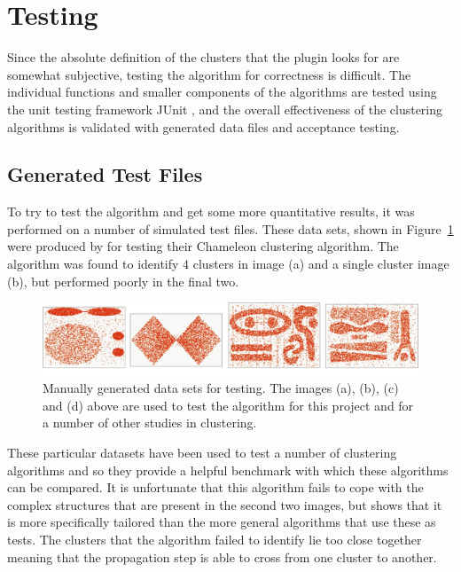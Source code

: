 
\section{Testing}
\label{sec:testing}

Since the absolute definition of the clusters that the plugin looks for are
somewhat subjective, testing the algorithm for correctness is difficult. The
individual functions and smaller components of the algorithms are tested using
the unit testing framework JUnit \cite{tahchiev2010junit}, and the overall
effectiveness of the clustering algorithms is validated with generated data
files and acceptance testing.

\subsection{Generated Test Files}
\label{sub:generated_test_files}

To try to test the algorithm and get some more quantitative results, it was
performed on a number of simulated test files. These data sets, shown in
Figure~\ref{fig:cam-tests} were produced by \citet{karypis1999chameleon} for
testing their Chameleon clustering algorithm. The algorithm was found to
identify 4 clusters in image (a) and a single cluster image (b), but performed
poorly in the final two.

\begin{figure}[tbh]
	\centering
	\includegraphics[width=0.9\linewidth]{cam-tests.png}
	\caption[Manually generated data sets for testing]{Manually generated data
		sets for testing. The images (a), (b), (c) and (d) above are used to
		test the algorithm for this project and for a number of other studies
		in clustering.}\label{fig:cam-tests}
\end{figure}

These particular datasets have been used to test a number of clustering
algorithms and so they provide a helpful benchmark with which these algorithms
can be compared. It is unfortunate that this algorithm fails to cope with the
complex structures that are present in the second two images, but shows that it
is more specifically tailored than the more general algorithms that use these
as tests. The clusters that the algorithm failed to identify lie too close
together meaning that the propagation step is able to cross from one cluster to
another.

